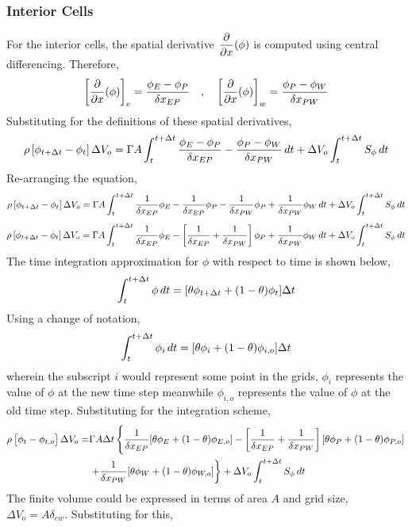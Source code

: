 \documentclass[class=report, 12pt, crop=false]{standalone}
\begin{document}
\begin{center}
\subsubsection{Interior Cells}
For the interior cells, the spatial derivative $\displaystyle{\frac{\partial}{\partial x}(\phi)}$ is computed using central differencing. Therefore, 
$$\left[\frac{\partial}{\partial x}(\phi)\right]_{e} = \frac{\phi_E - \phi_P}{\delta x_{EP}} \quad,\quad \left[\frac{\partial}{\partial x}(\phi)\right]_{w} = \frac{\phi_P - \phi_W}{\delta x_{PW}}$$
Substituting for the definitions of these spatial derivatives,
$$\rho \left[\phi_{t+\Delta t} - \phi_{t}\right]\Delta V_o = \Gamma A\int^{t+\Delta t}_{t}\frac{\phi_E - \phi_P}{\delta x_{EP}} - \frac{\phi_P - \phi_W}{\delta x_{PW}}\,dt + \Delta V_o\int^{t+\Delta t}_{t} S_\phi\,dt$$
Re-arranging the equation,
$$\rho \left[\phi_{t+\Delta t} - \phi_{t}\right]\Delta V_o = \Gamma A\int^{t+\Delta t}_{t} \frac{1}{\delta x_{EP}}\phi_E - \frac{1}{\delta x_{EP}}\phi_P - \frac{1}{\delta x_{PW}}\phi_P + \frac{1}{\delta x_{PW}}\phi_W\,dt + \Delta V_o\int^{t+\Delta t}_{t} S_\phi\,dt$$
$$\rho \left[\phi_{t+\Delta t} - \phi_{t}\right]\Delta V_o = \Gamma A\int^{t+\Delta t}_{t} \frac{1}{\delta x_{EP}}\phi_E - \left[\frac{1}{\delta x_{EP}} + \frac{1}{\delta x_{PW}}\right]\phi_P + \frac{1}{\delta x_{PW}}\phi_W\,dt + \Delta V_o\int^{t+\Delta t}_{t} S_\phi\,dt$$
The time integration approximation for $\phi$ with respect to time is shown below,
$$\int^{t+\Delta t}_{t} \phi\,dt = [\theta\phi_{t+\Delta t} + (1-\theta)\phi_{t}]\Delta t$$
Using a change of notation,
$$\int^{t+\Delta t}_{t} \phi_{i}\,dt = [\theta\phi_{i} + (1-\theta)\phi_{i,o}]\Delta t$$
wherein the subscript $i$ would represent some point in the grids, $\phi_{i}$ represents the value of $\phi$ at the new time step meanwhile $\phi_{i,o}$ represents the value of $\phi$ at the old time step. Substituting for the integration scheme,
\begin{equation*}
\begin{split}
\rho \left[\phi_{t} - \phi_{t,o}\right]\Delta V_o = & \Gamma A\Delta t\left\{\frac{1}{\delta x_{EP}}[\theta\phi_{E} + (1-\theta)\phi_{E,o}]  - \left[\frac{1}{\delta x_{EP}} + \frac{1}{\delta x_{PW}}\right][\theta\phi_{P} + (1-\theta)\phi_{P,o}]  \right.\\ & \left. + \frac{1}{\delta x_{PW}}[\theta\phi_{W} + (1-\theta)\phi_{W,o}]\right\} + \Delta V_o\int^{t+\Delta t}_{t} S_\phi\,dt
\end{split}
\end{equation*}
The finite volume could be expressed in terms of area $A$ and grid size, $\Delta V_o = A\delta_{ew}$. Substituting for this,
\begin{equation*}
\begin{split}

\end{split}
\end{equation*}
\end{center}
\end{document}
